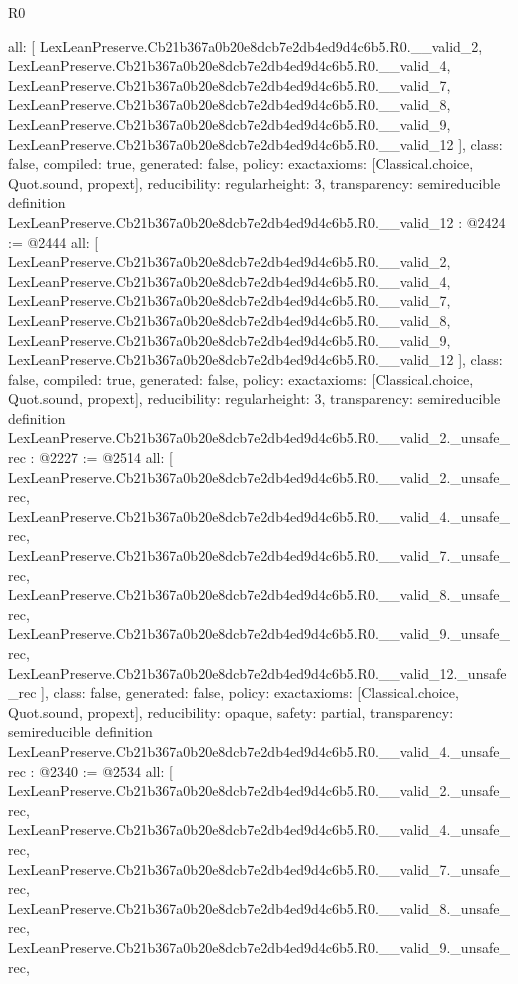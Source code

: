 \begin{lexlean}{R0}
\begin{coremodule}
{  all: [
    LexLeanPreserve.Cb21b367a0b20e8dcb7e2db4ed9d4c6b5.R0.__valid_2,
    LexLeanPreserve.Cb21b367a0b20e8dcb7e2db4ed9d4c6b5.R0.__valid_4,
    LexLeanPreserve.Cb21b367a0b20e8dcb7e2db4ed9d4c6b5.R0.__valid_7,
    LexLeanPreserve.Cb21b367a0b20e8dcb7e2db4ed9d4c6b5.R0.__valid_8,
    LexLeanPreserve.Cb21b367a0b20e8dcb7e2db4ed9d4c6b5.R0.__valid_9,
    LexLeanPreserve.Cb21b367a0b20e8dcb7e2db4ed9d4c6b5.R0.__valid_12
  ],
  class: false,
  compiled: true,
  generated: false,
  policy: exact{axioms: [Classical.choice, Quot.sound, propext]},
  reducibility: regular{height: 3},
  transparency: semireducible
}
definition LexLeanPreserve.Cb21b367a0b20e8dcb7e2db4ed9d4c6b5.R0.__valid_12 : @2424 := @2444 {
  all: [
    LexLeanPreserve.Cb21b367a0b20e8dcb7e2db4ed9d4c6b5.R0.__valid_2,
    LexLeanPreserve.Cb21b367a0b20e8dcb7e2db4ed9d4c6b5.R0.__valid_4,
    LexLeanPreserve.Cb21b367a0b20e8dcb7e2db4ed9d4c6b5.R0.__valid_7,
    LexLeanPreserve.Cb21b367a0b20e8dcb7e2db4ed9d4c6b5.R0.__valid_8,
    LexLeanPreserve.Cb21b367a0b20e8dcb7e2db4ed9d4c6b5.R0.__valid_9,
    LexLeanPreserve.Cb21b367a0b20e8dcb7e2db4ed9d4c6b5.R0.__valid_12
  ],
  class: false,
  compiled: true,
  generated: false,
  policy: exact{axioms: [Classical.choice, Quot.sound, propext]},
  reducibility: regular{height: 3},
  transparency: semireducible
}
definition LexLeanPreserve.Cb21b367a0b20e8dcb7e2db4ed9d4c6b5.R0.__valid_2._unsafe_rec : @2227 := @2514 {
  all: [
    LexLeanPreserve.Cb21b367a0b20e8dcb7e2db4ed9d4c6b5.R0.__valid_2._unsafe_rec,
    LexLeanPreserve.Cb21b367a0b20e8dcb7e2db4ed9d4c6b5.R0.__valid_4._unsafe_rec,
    LexLeanPreserve.Cb21b367a0b20e8dcb7e2db4ed9d4c6b5.R0.__valid_7._unsafe_rec,
    LexLeanPreserve.Cb21b367a0b20e8dcb7e2db4ed9d4c6b5.R0.__valid_8._unsafe_rec,
    LexLeanPreserve.Cb21b367a0b20e8dcb7e2db4ed9d4c6b5.R0.__valid_9._unsafe_rec,
    LexLeanPreserve.Cb21b367a0b20e8dcb7e2db4ed9d4c6b5.R0.__valid_12._unsafe_rec
  ],
  class: false,
  generated: false,
  policy: exact{axioms: [Classical.choice, Quot.sound, propext]},
  reducibility: opaque{},
  safety: partial,
  transparency: semireducible
}
definition LexLeanPreserve.Cb21b367a0b20e8dcb7e2db4ed9d4c6b5.R0.__valid_4._unsafe_rec : @2340 := @2534 {
  all: [
    LexLeanPreserve.Cb21b367a0b20e8dcb7e2db4ed9d4c6b5.R0.__valid_2._unsafe_rec,
    LexLeanPreserve.Cb21b367a0b20e8dcb7e2db4ed9d4c6b5.R0.__valid_4._unsafe_rec,
    LexLeanPreserve.Cb21b367a0b20e8dcb7e2db4ed9d4c6b5.R0.__valid_7._unsafe_rec,
    LexLeanPreserve.Cb21b367a0b20e8dcb7e2db4ed9d4c6b5.R0.__valid_8._unsafe_rec,
    LexLeanPreserve.Cb21b367a0b20e8dcb7e2db4ed9d4c6b5.R0.__valid_9._unsafe_rec,
}
\end{coremodule}
\end{lexlean}
